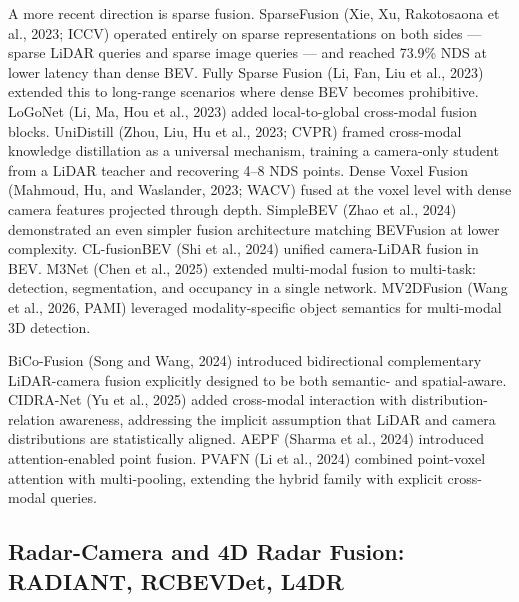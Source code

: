 A more recent direction is sparse fusion. SparseFusion (Xie, Xu, Rakotosaona et al., 2023; ICCV) operated entirely on sparse representations on both sides --- sparse LiDAR queries and sparse image queries --- and reached 73.9\% NDS at lower latency than dense BEV. Fully Sparse Fusion (Li, Fan, Liu et al., 2023) extended this to long-range scenarios where dense BEV becomes prohibitive. LoGoNet (Li, Ma, Hou et al., 2023) added local-to-global cross-modal fusion blocks. UniDistill (Zhou, Liu, Hu et al., 2023; CVPR) framed cross-modal knowledge distillation as a universal mechanism, training a camera-only student from a LiDAR teacher and recovering 4--8 NDS points. Dense Voxel Fusion (Mahmoud, Hu, and Waslander, 2023; WACV) fused at the voxel level with dense camera features projected through depth. SimpleBEV (Zhao et al., 2024) demonstrated an even simpler fusion architecture matching BEVFusion at lower complexity. CL-fusionBEV (Shi et al., 2024) unified camera-LiDAR fusion in BEV. M3Net (Chen et al., 2025) extended multi-modal fusion to multi-task: detection, segmentation, and occupancy in a single network. MV2DFusion (Wang et al., 2026, PAMI) leveraged modality-specific object semantics for multi-modal 3D detection.

BiCo-Fusion (Song and Wang, 2024) introduced bidirectional complementary LiDAR-camera fusion explicitly designed to be both semantic- and spatial-aware. CIDRA-Net (Yu et al., 2025) added cross-modal interaction with distribution-relation awareness, addressing the implicit assumption that LiDAR and camera distributions are statistically aligned. AEPF (Sharma et al., 2024) introduced attention-enabled point fusion. PVAFN (Li et al., 2024) combined point-voxel attention with multi-pooling, extending the hybrid family with explicit cross-modal queries.

\subsection{Radar-Camera and 4D Radar Fusion: RADIANT, RCBEVDet, L4DR}\label{radar-camera-and-4d-radar-fusion-radiant-rcbevdet-l4dr}

